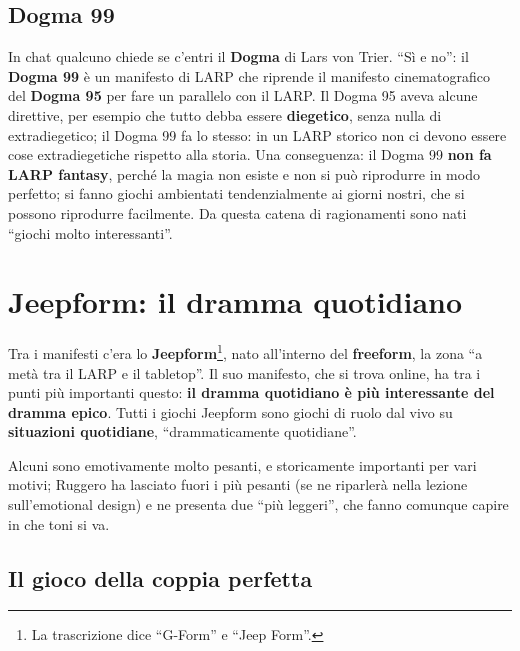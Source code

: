 \subsection{Dogma 99}

In chat qualcuno chiede se c'entri il \textbf{Dogma} di Lars von Trier.
``Sì e no'': il \textbf{Dogma 99} è un manifesto di LARP che riprende il
manifesto cinematografico del \textbf{Dogma 95} per fare un parallelo con il
LARP. Il Dogma 95 aveva alcune direttive, per esempio che tutto debba essere
\textbf{diegetico}, senza nulla di extradiegetico; il Dogma 99 fa lo stesso: in
un LARP storico non ci devono essere cose extradiegetiche rispetto alla storia.
Una conseguenza: il Dogma 99 \textbf{non fa LARP fantasy}, perché la magia non
esiste e non si può riprodurre in modo perfetto; si fanno giochi ambientati
tendenzialmente ai giorni nostri, che si possono riprodurre facilmente. Da
questa catena di ragionamenti sono nati ``giochi molto interessanti''.

\section{Jeepform: il dramma quotidiano}
\label{a2:sec:jeepform}



Tra i manifesti c'era lo \textbf{Jeepform}\footnote{La trascrizione dice
``G-Form'' e ``Jeep Form''.}, nato all'interno del \textbf{freeform}, la zona ``a
metà tra il LARP e il tabletop''. Il suo manifesto, che si trova online, ha tra i
punti più importanti questo: \textbf{il dramma quotidiano è più interessante del
dramma epico}. Tutti i giochi Jeepform sono giochi di ruolo dal vivo su
\textbf{situazioni quotidiane}, ``drammaticamente quotidiane''.

Alcuni sono emotivamente molto pesanti, e storicamente importanti per vari
motivi; Ruggero ha lasciato fuori i più pesanti (se ne riparlerà nella lezione
sull'emotional design) e ne presenta due ``più leggeri'', che fanno comunque
capire in che toni si va.

\subsection{Il gioco della coppia perfetta}


